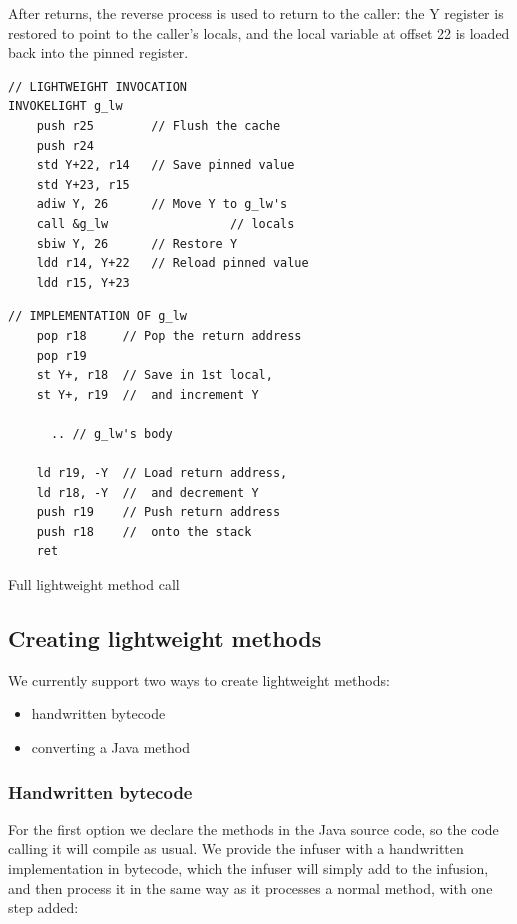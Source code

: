 After  returns, the reverse process is used to return to the caller: the Y register is restored to point to the caller's locals, and the local variable at offset 22 is loaded back into the pinned register.

\begin{listing}
\centering
\begin{minipage}[t]{0.48\textwidth}
\begin{verbatim}
// LIGHTWEIGHT INVOCATION
INVOKELIGHT g_lw
    push r25        // Flush the cache
    push r24
    std Y+22, r14   // Save pinned value
    std Y+23, r15
    adiw Y, 26      // Move Y to g_lw's
    call &g_lw                 // locals
    sbiw Y, 26      // Restore Y
    ldd r14, Y+22   // Reload pinned value
    ldd r15, Y+23
\end{verbatim}
\end{minipage}\hfill
\begin{minipage}[t]{0.48\textwidth}
\centering
\begin{verbatim}
// IMPLEMENTATION OF g_lw
    pop r18     // Pop the return address
    pop r19
    st Y+, r18  // Save in 1st local,
    st Y+, r19  //  and increment Y

      .. // g_lw's body

    ld r19, -Y  // Load return address,
    ld r18, -Y  //  and decrement Y
    push r19    // Push return address
    push r18    //  onto the stack
    ret
\end{verbatim}
\end{minipage}
\caption{Full lightweight method call}
\label{lst-full-lighweight-method-call}
\end{listing}


\subsection{Creating lightweight methods}
We currently support two ways to create lightweight methods:
\begin{itemize}
	\item handwritten bytecode
	\item converting a Java method 
\end{itemize}

\subsubsection{Handwritten bytecode}
For the first option we declare the methods  in the Java source code, so the code calling it will compile as usual. We provide the infuser with a handwritten implementation in bytecode, which the infuser will simply add to the infusion, and then process it in the same way as it processes a normal method, with one step added:

